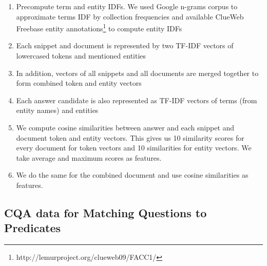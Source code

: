 \begin{enumerate}
\setlength\itemsep{0em}
\item Precompute term and entity IDFs. We used Google n-grams corpus to approximate terms IDF by collection frequencies and available ClueWeb Freebase entity annotations\footnote{http://lemurproject.org/clueweb09/FACC1/} to compute entity IDFs
\item Each snippet and document is represented by two TF-IDF vectors of lowercased tokens and mentioned entities
\item In addition, vectors of all snippets and all documents are merged together to form combined token and entity vectors
\item Each answer candidate is also represented as TF-IDF vectors of terms (from entity names) and entities
\item We compute cosine similarities between answer and each snippet and document token and entity vectors. This gives us 10 similarity scores for every document for token vectors and 10 similarities for entity vectors. We take average and maximum scores as features.
\item We do the same for the combined document and use cosine similarities as features.
\end{enumerate}

\subsection{CQA data for Matching Questions to Predicates}
\label{section:method:cqa}

